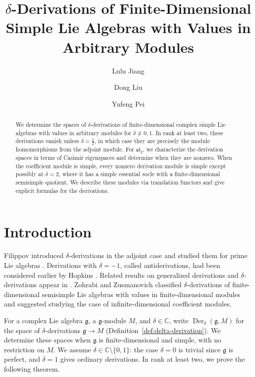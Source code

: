 \documentclass[11pt,reqno]{amsart}
\title[\texorpdfstring{$\delta$}{delta}-Derivations of Finite-Dimensional Simple Lie Algebras]
{\texorpdfstring{$\delta$}{delta}-Derivations of Finite-Dimensional Simple Lie Algebras
with Values in Arbitrary Modules}
\author[Lulu Jiang]{Lulu Jiang}
\author[Dong Liu]{Dong Liu}
\author{Yufeng Pei}
\date{}
\numberwithin{equation}{section}
\newcommand{\C}{\mathbb C}
\newcommand{\g}{\mathfrak g}
\DeclareMathOperator{\Der}{Der}
\theoremstyle{definition}
\theoremstyle{remark}
\begin{document}
\begin{abstract}
We determine the spaces of \(\delta\)-derivations of finite-dimensional
complex simple Lie algebras with values in arbitrary modules for
\(\delta\ne0,1\). In rank at least two, these derivations vanish
unless \(\delta=\frac{1}{2}\), in which case they are precisely the
module homomorphisms from the adjoint module. For \(\mathfrak{sl}_2\), we
characterize the derivation spaces in terms of Casimir eigenspaces and
determine when they are nonzero. When the coefficient module is simple,
every nonzero derivation module is simple except possibly at \(\delta=2\),
where it has a simple essential socle with a finite-dimensional semisimple
quotient. We describe these modules via translation functors and give
explicit formulas for the derivations.
\end{abstract}
\maketitle

\section{Introduction}

Filippov introduced \(\delta\)-derivations in the adjoint case
\cite{Filippov98} and studied them for prime Lie algebras
\cite{Filippov99}. Derivations with \(\delta=-1\), called
antiderivations, had been considered earlier by Hopkins \cite{Hopkins96}.
Related results on generalized derivations and \(\delta\)-derivations
appear in \cite{LL00,Zus10}.
Zohrabi and Zusmanovich \cite{ZZ21} classified \(\delta\)-derivations
of finite-dimensional semisimple Lie algebras with values in
finite-dimensional modules and suggested studying the case of
infinite-dimensional coefficient modules.

For a complex Lie algebra \(\g\), a \(\g\)-module \(M\), and
\(\delta\in\C\), write \(\Der_\delta(\g,M)\) for the space of
\(\delta\)-derivations \(\g\to M\)
(Definition~\ref{def:delta-derivation}).
We determine these spaces when \(\g\) is finite-dimensional and simple,
with no restriction on \(M\). We assume
\(\delta\in\C\setminus\{0,1\}\): the case \(\delta=0\) is trivial
since \(\g\) is perfect, and \(\delta=1\) gives ordinary derivations.
In rank at least two, we prove the following theorem.
\end{document}
